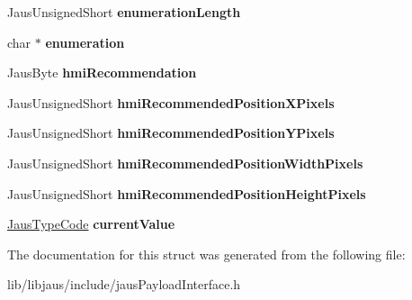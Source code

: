 \begin{DoxyCompactItemize}
\item 
\hypertarget{struct_jaus_command_interface_struct_adb5bd916ffa861ceed4e3ec0accd11f3}{\-Jaus\-Unsigned\-Short {\bfseries enumeration\-Length}}\label{struct_jaus_command_interface_struct_adb5bd916ffa861ceed4e3ec0accd11f3}

\item 
\hypertarget{struct_jaus_command_interface_struct_a5dfd3518685d11cea8b9a730a1569579}{char $\ast$ {\bfseries enumeration}}\label{struct_jaus_command_interface_struct_a5dfd3518685d11cea8b9a730a1569579}

\item 
\hypertarget{struct_jaus_command_interface_struct_a86fb5987921ab3e8dd28b84f2b167032}{\-Jaus\-Byte {\bfseries hmi\-Recommendation}}\label{struct_jaus_command_interface_struct_a86fb5987921ab3e8dd28b84f2b167032}

\item 
\hypertarget{struct_jaus_command_interface_struct_a51126e03def575f756ba850015252f0e}{\-Jaus\-Unsigned\-Short {\bfseries hmi\-Recommended\-Position\-X\-Pixels}}\label{struct_jaus_command_interface_struct_a51126e03def575f756ba850015252f0e}

\item 
\hypertarget{struct_jaus_command_interface_struct_ac5867879aa039e46bcf5ae11f54c33de}{\-Jaus\-Unsigned\-Short {\bfseries hmi\-Recommended\-Position\-Y\-Pixels}}\label{struct_jaus_command_interface_struct_ac5867879aa039e46bcf5ae11f54c33de}

\item 
\hypertarget{struct_jaus_command_interface_struct_a723934cd37bf9d257c3d8f016c9eb7c9}{\-Jaus\-Unsigned\-Short {\bfseries hmi\-Recommended\-Position\-Width\-Pixels}}\label{struct_jaus_command_interface_struct_a723934cd37bf9d257c3d8f016c9eb7c9}

\item 
\hypertarget{struct_jaus_command_interface_struct_a0d440a9e85a5206f378b89ff90b958cf}{\-Jaus\-Unsigned\-Short {\bfseries hmi\-Recommended\-Position\-Height\-Pixels}}\label{struct_jaus_command_interface_struct_a0d440a9e85a5206f378b89ff90b958cf}

\item 
\hypertarget{struct_jaus_command_interface_struct_affcdda5201e21a701b73490a1478169d}{\hyperlink{union_jaus_type_code}{\-Jaus\-Type\-Code} {\bfseries current\-Value}}\label{struct_jaus_command_interface_struct_affcdda5201e21a701b73490a1478169d}

\end{DoxyCompactItemize}


\-The documentation for this struct was generated from the following file\-:\begin{DoxyCompactItemize}
\item 
lib/libjaus/include/jaus\-Payload\-Interface.\-h\end{DoxyCompactItemize}
